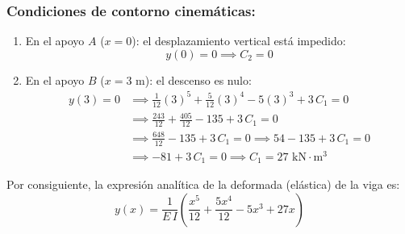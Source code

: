 \subsubsection*{Condiciones de contorno cinemáticas:}
\begin{enumerate}
    \item En el apoyo $A$ ($x = 0$): el desplazamiento vertical está impedido:
          \begin{equation}
              y(0) = 0 \implies C_2 = 0
          \end{equation}
    \item En el apoyo $B$ ($x = 3\text{ m}$): el descenso es nulo:
          \begin{align}
              y(3) = 0 & \implies \frac{1}{12}(3)^5 + \frac{5}{12}(3)^4 - 5(3)^3 + 3\,C_1 = 0 \nonumber \\
                       & \implies \frac{243}{12} + \frac{405}{12} - 135 + 3\,C_1 = 0 \nonumber \\
                       & \implies \frac{648}{12} - 135 + 3\,C_1 = 0 \implies 54 - 135 + 3\,C_1 = 0 \nonumber \\
                       & \implies -81 + 3\,C_1 = 0 \implies \boxed{C_1 = 27\text{ kN}\cdot\text{m}^3}
          \end{align}
\end{enumerate}

Por consiguiente, la expresión analítica de la deformada (elástica) de la viga es:
\begin{equation}
    \boxed{y(x) = \frac{1}{E\,I}\left( \frac{x^5}{12} + \frac{5x^4}{12} - 5x^3 + 27x \right)}
    \label{eq:elastica_trapezoidal_general}
\end{equation}


